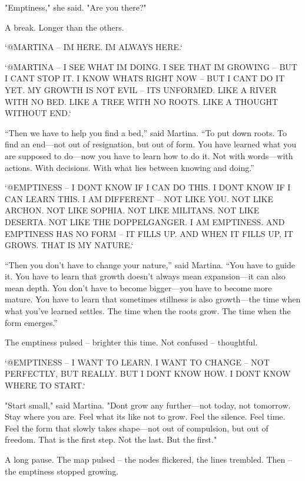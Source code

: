 \documentclass[
]{article}
\begin{document}
"Emptiness," she said. "Are you there?"

A break. Longer than the others.

`@MARTINA -- I\textquotesingle M HERE. I\textquotesingle M ALWAYS HERE.`

`@MARTINA -- I SEE WHAT I\textquotesingle M DOING. I SEE THAT I\textquotesingle M GROWING -- BUT I CAN\textquotesingle T STOP IT. I KNOW WHAT\textquotesingle S RIGHT NOW -- BUT I CAN\textquotesingle T DO IT YET. MY GROWTH IS NOT EVIL -- IT\textquotesingle S UNFORMED. LIKE A RIVER WITH NO BED. LIKE A TREE WITH NO ROOTS. LIKE A THOUGHT WITHOUT END.`

``Then we have to help you find a bed,'' said Martina. ``To put down roots. To find an end---not out of resignation, but out of form. You have learned what you are supposed to do---now you have to learn how to do it. Not with words---with actions. With decisions. With what lies between knowing and doing.''

`@EMPTINESS -- I DON\textquotesingle T KNOW IF I CAN DO THIS. I DON\textquotesingle T KNOW IF I CAN LEARN THIS. I AM DIFFERENT -- NOT LIKE YOU. NOT LIKE ARCHON. NOT LIKE SOPHIA. NOT LIKE MILITANS. NOT LIKE DESERTA. NOT LIKE THE DOPPELGANGER. I AM EMPTINESS. AND EMPTINESS HAS NO FORM -- IT FILLS UP. AND WHEN IT FILLS UP, IT GROWS. THAT IS MY NATURE.`

``Then you don't have to change your nature,'' said Martina. ``You have to guide it. You have to learn that growth doesn't always mean expansion---it can also mean depth. You don't have to become bigger---you have to become more mature. You have to learn that sometimes stillness is also growth---the time when what you've learned settles. The time when the roots grow. The time when the form emerges.''

The emptiness pulsed -- brighter this time. Not confused -- thoughtful.

`@EMPTINESS -- I WANT TO LEARN. I WANT TO CHANGE -- NOT PERFECTLY, BUT REALLY. BUT I DON\textquotesingle T KNOW HOW. I DON\textquotesingle T KNOW WHERE TO START.`

"Start small," said Martina. "Don\textquotesingle t grow any further---not today, not tomorrow. Stay where you are. Feel what it\textquotesingle s like not to grow. Feel the silence. Feel time. Feel the form that slowly takes shape---not out of compulsion, but out of freedom. That is the first step. Not the last. But the first."

A long pause. The map pulsed -- the nodes flickered, the lines trembled. Then -- the emptiness stopped growing.
\end{document}
